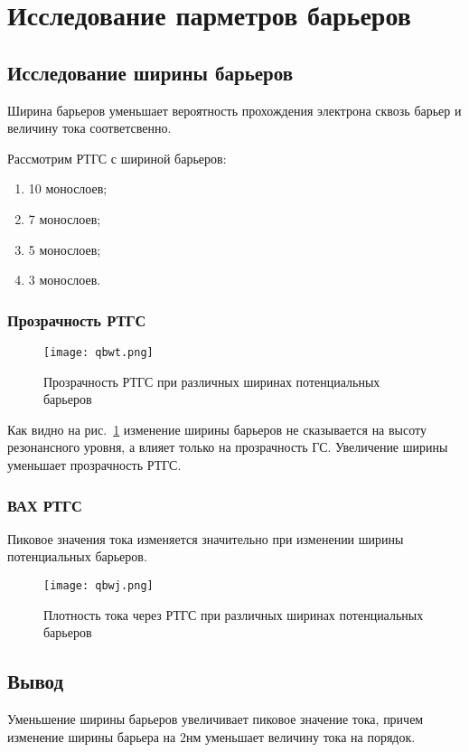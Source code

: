 \section{Исследование парметров барьеров}

\subsection{Исследование ширины барьеров}
Ширина барьеров уменьшает вероятность прохождения электрона сквозь барьер и величину тока соответсвенно. 

Рассмотрим РТГС с шириной барьеров:
\begin{enumerate}
	\item 10 монослоев;
	\item 7 монослоев;
	\item 5 монослоев;
	\item 3 монослоев.
\end{enumerate}

\subsubsection{Прозрачность РТГС}
\begin{figure}[h]
	\centering
	\texttt{[image: qbwt.png]}
	\caption{Прозрачность РТГС при различных ширинах потенциальных барьеров}
	\label{fig:qbwt}
\end{figure}

Как видно на рис.~\ref{fig:qbwt} изменение ширины барьеров не сказывается на высоту резонансного уровня, а влияет только на прозрачность ГС. Увеличение ширины уменьшает прозрачность РТГС.

\subsubsection{ВАХ РТГС}
Пиковое значения тока изменяется значительно при изменении ширины потенциальных барьеров.
\begin{figure}[h]
	\centering
	\texttt{[image: qbwj.png]}
	\caption{Плотность тока через РТГС при различных ширинах потенциальных барьеров}
	\label{fig:qbwj}
\end{figure}

\subsection{Вывод}
Уменьшение ширины барьеров увеличивает пиковое значение тока, причем изменение ширины барьера на $2$нм уменьшает величину тока на порядок.